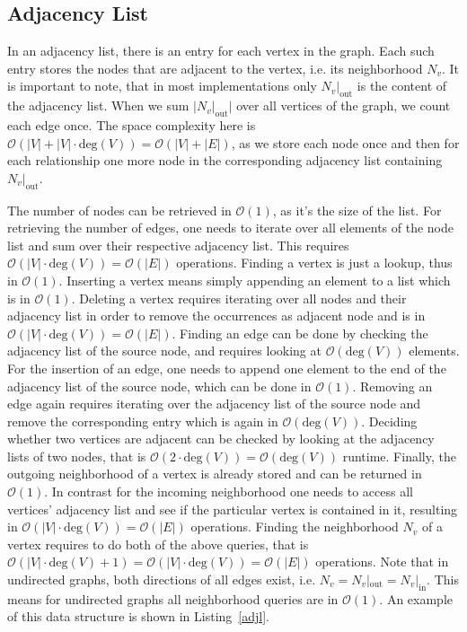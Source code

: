         \subsection*{Adjacency List}
        In an adjacency list, there is an entry for each vertex in the graph. 
        Each such entry stores the nodes that are adjacent to the vertex, i.e. its neighborhood $N_v$. 
        It is important to note, that in most implementations only $N_v |_\text{out}$ is the content of the adjacency list.
        When we sum $|N_v |_\text{out}|$ over all vertices of the graph, we count each edge once.
        The space complexity here is $\mathcal{O}(|V| + |V| \cdot \text{deg}(V)) = \mathcal{O}(|V| + |E|)$, as we store each node once and then for each relationship one more node in the corresponding adjacency list containing $N_v |_\text{out}$.

        The number of nodes can be retrieved in $\mathcal{O}(1)$, as it's the size of the list.
        For retrieving the number of edges, one needs to iterate over all elements of the node list and sum over their respective adjacency list. 
        This requires $\mathcal{O}(|V| \cdot \text{deg}(V)) = \mathcal{O}(|E|)$ operations.
        Finding a vertex is just a lookup, thus in $\mathcal{O}(1)$.
        Inserting a vertex means simply appending an element to a list which is in $\mathcal{O}(1)$.
        Deleting a vertex requires iterating over all nodes and their adjacency list in order to remove the occurrences as adjacent node and is in $\mathcal{O}(|V| \cdot \text{deg}(V)) = \mathcal{O}(|E|)$.
        Finding an edge can be done by checking the adjacency list of the source node, and requires looking at $\mathcal{O}(\text{deg}(V))$ elements.
        For the insertion of an edge, one needs to append one element to the end of the adjacency list of the source node, which can be done in $\mathcal{O}(1)$.
        Removing an edge again requires iterating over the adjacency list of the source node and remove the corresponding entry which is again in $\mathcal{O}(\text{deg}(V))$.        
        Deciding whether two vertices are adjacent can be checked by looking at the adjacency lists of two nodes, that is $\mathcal{O}(2 \cdot \text{deg}(V)) = \mathcal{O}(\text{deg}(V))$ runtime.        
        Finally, the outgoing neighborhood of a vertex is already stored and can be returned in $\mathcal{O}(1)$.
        In contrast for the incoming neighborhood one needs to access all vertices' adjacency list and see if the particular vertex is contained in it, resulting in $\mathcal{O}(|V| \cdot \text{deg}(V)) = \mathcal{O}(|E|)$ operations.
        Finding the neighborhood $N_v$ of a vertex requires to do both of the above queries, that is $\mathcal{O}(|V| \cdot \text{deg}(V) + 1) = \mathcal{O}(|V| \cdot \text{deg}(V))  = \mathcal{O}(|E|)$ operations.  
        Note that in undirected graphs, both directions of all edges exist, i.e. $N_v = N_v |_\text{out} = N_v |_\text{in}$. This means for undirected graphs all neighborhood queries are in $\mathcal{O}(1)$.      
        An example of this data structure is shown in Listing~\ref{adjl}.
        
